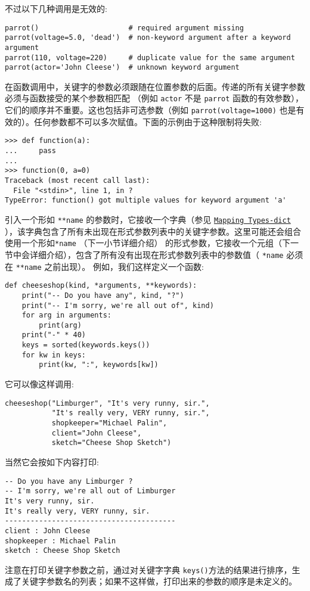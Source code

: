 不过以下几种调用是无效的:
\begin{lstlisting}
parrot()                     # required argument missing
parrot(voltage=5.0, 'dead')  # non-keyword argument after a keyword argument
parrot(110, voltage=220)     # duplicate value for the same argument
parrot(actor='John Cleese')  # unknown keyword argument
\end{lstlisting}

在函数调用中，关键字的参数必须跟随在位置参数的后面。传递的所有关键字参数必须与函数接受的某个参数相匹配 （例如 \texttt{actor} 不是 \texttt{parrot} 函数的有效参数），它们的顺序并不重要。这也包括非可选参数（例如 \texttt{parrot(voltage=1000)} 也是有效的）。任何参数都不可以多次赋值。下面的示例由于这种限制将失败:
\begin{lstlisting}
>>> def function(a):
...     pass
...
>>> function(0, a=0)
Traceback (most recent call last):
  File "<stdin>", line 1, in ?
TypeError: function() got multiple values for keyword argument 'a'
\end{lstlisting}

引入一个形如 \texttt{**name} 的参数时，它接收一个字典（参见 \href{https://docs.python.org/3/library/stdtypes.html#typesmapping}{\texttt{Mapping Types-dict}} ），该字典包含了所有未出现在形式参数列表中的关键字参数。这里可能还会组合使用一个形如\texttt{*name} （下一小节详细介绍） 的形式参数，它接收一个元组（下一节中会详细介绍），包含了所有没有出现在形式参数列表中的参数值（ \texttt{*name} 必须在 \texttt{**name} 之前出现）。 例如，我们这样定义一个函数:
\begin{lstlisting}
def cheeseshop(kind, *arguments, **keywords):
    print("-- Do you have any", kind, "?")
    print("-- I'm sorry, we're all out of", kind)
    for arg in arguments:
        print(arg)
    print("-" * 40)
    keys = sorted(keywords.keys())
    for kw in keys:
        print(kw, ":", keywords[kw])
\end{lstlisting}
它可以像这样调用:
\begin{lstlisting}
cheeseshop("Limburger", "It's very runny, sir.",
           "It's really very, VERY runny, sir.",
           shopkeeper="Michael Palin",
           client="John Cleese",
           sketch="Cheese Shop Sketch")
\end{lstlisting}
当然它会按如下内容打印:
\begin{lstlisting}
-- Do you have any Limburger ?
-- I'm sorry, we're all out of Limburger
It's very runny, sir.
It's really very, VERY runny, sir.
----------------------------------------
client : John Cleese
shopkeeper : Michael Palin
sketch : Cheese Shop Sketch
\end{lstlisting}
注意在打印关键字参数之前，通过对关键字字典 \texttt{keys()}方法的结果进行排序，生成了关键字参数名的列表；如果不这样做，打印出来的参数的顺序是未定义的。
